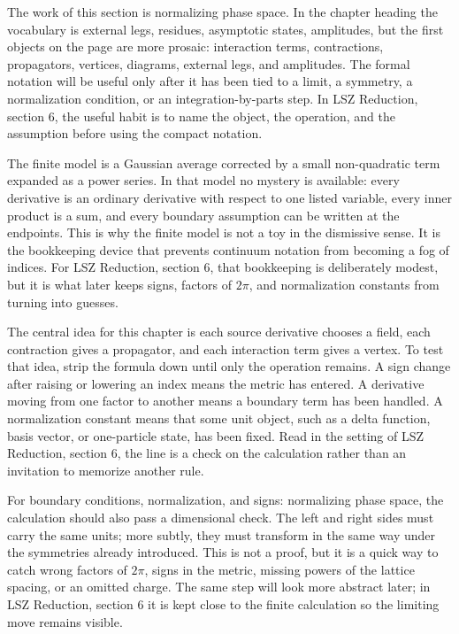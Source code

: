 The work of this section is normalizing phase space.  In the chapter heading the vocabulary is external legs, residues, asymptotic states, amplitudes, but the first objects on the page are more prosaic: interaction terms, contractions, propagators, vertices, diagrams, external legs, and amplitudes.  The formal notation will be useful only after it has been tied to a limit, a symmetry, a normalization condition, or an integration-by-parts step.  In LSZ Reduction, section 6, the useful habit is to name the object, the operation, and the assumption before using the compact notation.

The finite model is a Gaussian average corrected by a small non-quadratic term expanded as a power series.  In that model no mystery is available: every derivative is an ordinary derivative with respect to one listed variable, every inner product is a sum, and every boundary assumption can be written at the endpoints.  This is why the finite model is not a toy in the dismissive sense.  It is the bookkeeping device that prevents continuum notation from becoming a fog of indices.  For LSZ Reduction, section 6, that bookkeeping is deliberately modest, but it is what later keeps signs, factors of \(2\pi\), and normalization constants from turning into guesses.

The central idea for this chapter is each source derivative chooses a field, each contraction gives a propagator, and each interaction term gives a vertex.  To test that idea, strip the formula down until only the operation remains.  A sign change after raising or lowering an index means the metric has entered.  A derivative moving from one factor to another means a boundary term has been handled.  A normalization constant means that some unit object, such as a delta function, basis vector, or one-particle state, has been fixed.  Read in the setting of LSZ Reduction, section 6, the line is a check on the calculation rather than an invitation to memorize another rule.

For boundary conditions, normalization, and signs: normalizing phase space, the calculation should also pass a dimensional check.  The left and right sides must carry the same units; more subtly, they must transform in the same way under the symmetries already introduced.  This is not a proof, but it is a quick way to catch wrong factors of \(2\pi\), signs in the metric, missing powers of the lattice spacing, or an omitted charge.  The same step will look more abstract later; in LSZ Reduction, section 6 it is kept close to the finite calculation so the limiting move remains visible.

